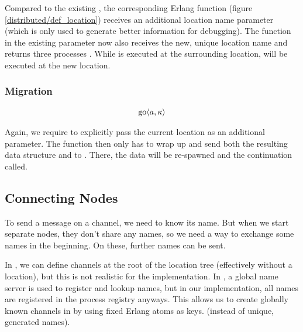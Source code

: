 Compared to the existing ,
the corresponding Erlang function 
(figure \ref{distributed/def_location})
receives an additional location name parameter
(which is only used to generate better information for debugging).
The function in the existing parameter now also receives the new,
unique location name and returns three processes .
While  is executed at the surrounding location,
 will be executed at the new location.



\subsubsection{Migration}

\begin{align*}
  \operatorname{go} \langle a, \kappa \rangle
\end{align*}

Again, we require to explicitly pass the current location
as an additional parameter.
The function 
then only has to wrap up  and send both
the resulting data structure and 
to .
There, the data will be re-spawned and the continuation called.


\subsection{Connecting Nodes}

To send a message on a channel, we need to know its name.
But when we start separate nodes, they don't share any names,
so we need a way to exchange some names in the beginning.
On these, further names can be sent.

In \distjoincalc, we can define channels at the root of the location tree
(effectively without a location), but this is not realistic for the
implementation.
In \cite{fournet_jocaml:_2002},
a global name server is used to register and lookup names,
but in our implementation,
all names are registered in the process registry anyways.
This allows us to create globally known channels
in  by using fixed Erlang atoms as keys.
(instead of unique, generated names).


